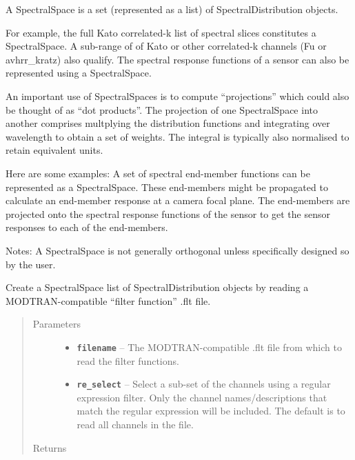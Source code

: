 \documentclass[a4paper,10pt,english]{sphinxmanual}
\begin{document}
\begin{fulllineitems}
\label{packages:radute.SpectralSpace}
A SpectralSpace is a set (represented as a list) of SpectralDistribution objects.

For example, the full Kato correlated-k list of spectral slices constitutes a SpectralSpace.
A sub-range of of Kato or other correlated-k channels (Fu or avhrr\_kratz) also qualify.
The spectral response functions of a sensor can also be represented using a SpectralSpace.

An important use of SpectralSpaces is to compute ``projections'' which could also be thought of as
``dot products''. The projection of one SpectralSpace into another comprises multplying the
distribution functions and integrating over wavelength to obtain a set of weights. The integral is
typically also normalised to retain equivalent units.

Here are some examples:
A set of spectral end-member functions can be represented as a SpectralSpace. These end-members might
be propagated to calculate an end-member response at a camera focal plane. The end-members are projected
onto the spectral response functions of the sensor to get the sensor responses to each of the end-members.

Notes: A SpectralSpace is not generally orthogonal unless specifically designed so by the user.

\begin{fulllineitems}
\label{packages:radute.SpectralSpace.from_flt_file}
Create a SpectralSpace list of SpectralDistribution objects by reading a MODTRAN-compatible
``filter function'' .flt file.
\begin{quote}\begin{description}
\item[{Parameters}] \leavevmode\begin{itemize}
\item {} 
\textbf{\texttt{filename}} -- The MODTRAN-compatible .flt file from which to read the filter functions.

\item {} 
\textbf{\texttt{re\_select}} -- Select a sub-set of the channels using a regular expression filter. Only the channel
names/descriptions that match the regular expression will be included. The default is to read
all channels in the file.

\end{itemize}

\item[{Returns}] \leavevmode


\end{description}\end{quote}

\end{fulllineitems}


\end{fulllineitems}
\end{document}
